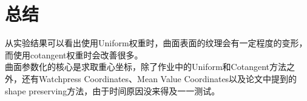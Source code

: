 \documentclass[14pt]{scrartcl} %
\begin{document}
	\pagebreak
	\section{总结}
	从实验结果可以看出使用Uniform权重时，曲面表面的纹理会有一定程度的变形，而使用cotangent权重时会改善很多。\\
	曲面参数化的核心是求取重心坐标，除了作业中的Uniform和Cotangent方法之外，还有Watchpress Coordinates、Mean Value Coordinates以及论文\cite{floater1997parametrization}中提到的shape preserving方法，由于时间原因没来得及一一测试。
	
	
	
	
\end{document}
